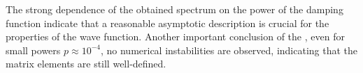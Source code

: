The strong dependence of the obtained spectrum on the power of the damping function indicate that a reasonable asymptotic description is crucial for the properties of the wave function.
Another important conclusion of the , even for small powers $p\approx 10^{-4}$, no numerical instabilities are observed, indicating that the matrix elements are still well-defined.
%

